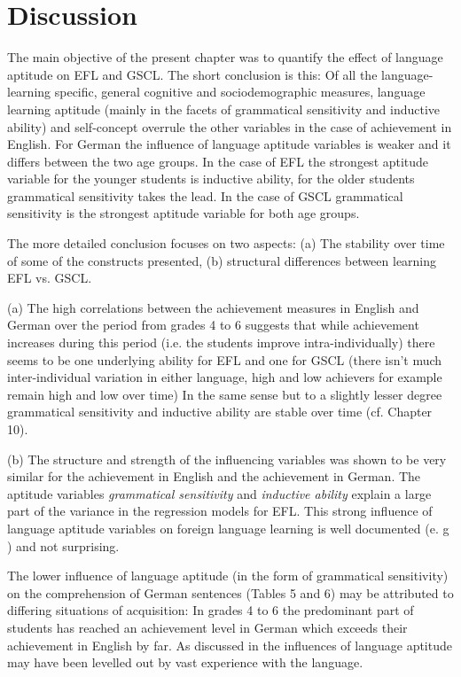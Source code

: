 \documentclass[output=paper]{langsci/langscibook}
\begin{document}
\section{Discussion}

The main objective of the present chapter was to quantify the effect of language aptitude on EFL and GSCL. The short conclusion is this: Of all the language-learning specific, general cognitive and sociodemographic measures, language learning aptitude (mainly in the facets of grammatical sensitivity and inductive ability) and self-concept overrule the other variables in the case of achievement in English. For German the influence of language aptitude variables is weaker and it differs between the two age groups. In the case of EFL the strongest aptitude variable for the younger students is inductive ability, for the older students grammatical sensitivity takes the lead. In the case of GSCL grammatical sensitivity is the strongest aptitude variable for both age groups.

The more detailed conclusion focuses on two aspects: (a) The stability over time of some of the constructs presented, (b) structural differences between learning EFL vs. GSCL. 

(a) The high correlations between the achievement measures in English and German over the period from grades 4 to 6 suggests that while achievement increases during this period (i.e. the students improve intra-individually) there seems to be one underlying ability for EFL and one for GSCL (there isn’t much inter-individual variation in either language, high and low achievers for example remain high and low over time) In the same sense but to a slightly lesser degree grammatical sensitivity and inductive ability are stable over time (cf. Chapter 10).

(b) The structure and strength of the influencing variables was shown to be very similar for the achievement in English and the achievement in German. The aptitude variables \textit{grammatical sensitivity} and \textit{inductive ability} explain a large part of the variance in the regression models for EFL. This strong influence of language aptitude variables on foreign language learning is well documented (e. g \citealt{Li2016}) and not surprising. 

The lower influence of language aptitude (in the form of grammatical sensitivity) on the comprehension of German sentences (Tables 5 and 6) may be attributed to differing situations of acquisition: In grades 4 to 6 the predominant part of students has reached an achievement level in German which exceeds their achievement in English by far. As discussed in  the influences of language aptitude may have been levelled out by vast experience with the language.
\end{document}
